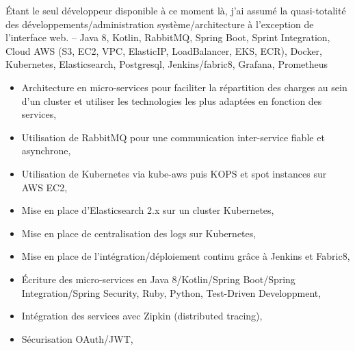 \documentclass[11pt,a4paper]{moderncv}
\begin{document}
{\begin{itemize}
{        Étant le seul développeur disponible à ce moment là, j'ai assumé la quasi-totalité des développements/administration système/architecture à l'exception de l'interface web.
        {\tiny -- Java 8, Kotlin, RabbitMQ, Spring Boot, Sprint Integration, Cloud AWS (S3, EC2, VPC, ElasticIP, LoadBalancer, EKS, ECR), Docker, Kubernetes, Elasticsearch, Postgresql, Jenkins/fabric8, Grafana, Prometheus}
        \begin{itemize}
        \item Architecture en micro-services pour faciliter la répartition des charges au sein d'un cluster et utiliser les technologies les plus adaptées en fonction des services,
        \item Utilisation de RabbitMQ pour une communication inter-service fiable et asynchrone,
        \item Utilisation de Kubernetes via kube-aws puis KOPS et spot instances sur AWS EC2,
        \item Mise en place d'Elasticsearch 2.x sur un cluster Kubernetes,
        \item Mise en place de centralisation des logs sur Kubernetes,
        \item Mise en place de l'intégration/déploiement continu grâce à Jenkins et Fabric8,
        \item Écriture des micro-services en Java 8/Kotlin/Spring Boot/Spring Integration/Spring Security, Ruby, Python, Test-Driven Developpment,
        \item Intégration des services avec Zipkin (distributed tracing),
        \item Sécurisation OAuth/JWT,
        \end{itemize}
      }
\end{itemize}
}
\end{document}
